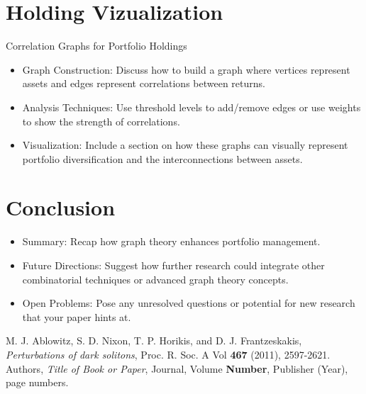 \documentclass{article}
\begin{document}
\section{Holding Vizualization}

Correlation Graphs for Portfolio Holdings

\begin{itemize}
    \item Graph Construction: Discuss how to build a graph where vertices represent assets and edges represent correlations between returns.
    \item Analysis Techniques: Use threshold levels to add/remove edges or use weights to show the strength of correlations.
    \item Visualization: Include a section on how these graphs can visually represent portfolio diversification and the interconnections between assets.
\end{itemize}


\section{Conclusion}

\begin{itemize}
    \item Summary: Recap how graph theory enhances portfolio management.
    \item Future Directions: Suggest how further research could integrate other combinatorial techniques or advanced graph theory concepts.
    \item Open Problems: Pose any unresolved questions or potential for new research that your paper hints at.
\end{itemize}



\begin{thebibliography}{99}
    M. J. Ablowitz, S. D. Nixon, T. P. Horikis, and D. J. Frantzeskakis, \emph{Perturbations of dark solitons}, Proc. R. Soc. A Vol \textbf{467} (2011), 2597-2621.
    Authors, \emph{Title of Book or Paper}, Journal, Volume \textbf{Number}, Publisher (Year), page numbers.
\end{thebibliography}
\end{document}
